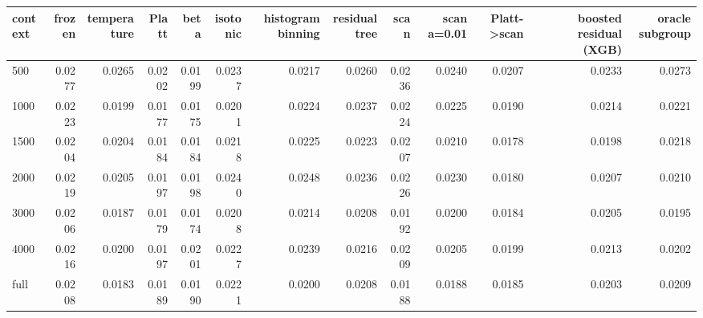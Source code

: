 \begin{tabular}{lrrrrrrrrrrrr}
\toprule
context & frozen & temperature & Platt & beta & isotonic & histogram binning & residual tree & scan & scan a=0.01 & Platt->scan & boosted residual (XGB) & oracle subgroup \\
\midrule
500 & 0.0277 & 0.0265 & 0.0202 & 0.0199 & 0.0237 & 0.0217 & 0.0260 & 0.0236 & 0.0240 & 0.0207 & 0.0233 & 0.0273 \\
1000 & 0.0223 & 0.0199 & 0.0177 & 0.0175 & 0.0201 & 0.0224 & 0.0237 & 0.0224 & 0.0225 & 0.0190 & 0.0214 & 0.0221 \\
1500 & 0.0204 & 0.0204 & 0.0184 & 0.0184 & 0.0218 & 0.0225 & 0.0223 & 0.0207 & 0.0210 & 0.0178 & 0.0198 & 0.0218 \\
2000 & 0.0219 & 0.0205 & 0.0197 & 0.0198 & 0.0240 & 0.0248 & 0.0236 & 0.0226 & 0.0230 & 0.0180 & 0.0207 & 0.0210 \\
3000 & 0.0206 & 0.0187 & 0.0179 & 0.0174 & 0.0208 & 0.0214 & 0.0208 & 0.0192 & 0.0200 & 0.0184 & 0.0205 & 0.0195 \\
4000 & 0.0216 & 0.0200 & 0.0197 & 0.0201 & 0.0227 & 0.0239 & 0.0216 & 0.0209 & 0.0205 & 0.0199 & 0.0213 & 0.0202 \\
full & 0.0208 & 0.0183 & 0.0189 & 0.0190 & 0.0221 & 0.0200 & 0.0208 & 0.0188 & 0.0188 & 0.0185 & 0.0203 & 0.0209 \\
\bottomrule
\end{tabular}
